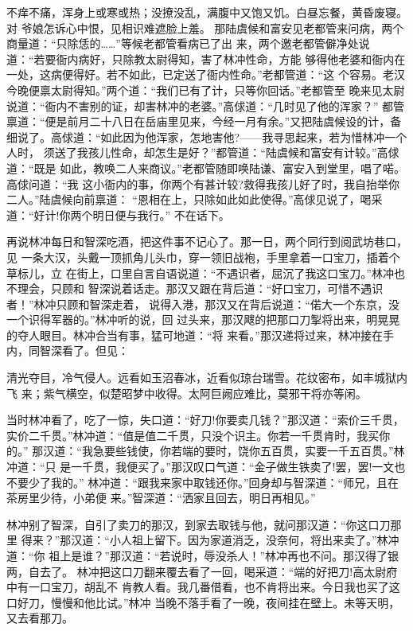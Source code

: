 不痒不痛，浑身上或寒或热；没撩没乱，满腹中又饱又饥。白昼忘餐，黄昏废寝。对
爷娘怎诉心中恨，见相识难遮脸上羞。
那陆虞候和富安见老都管来问病，两个商量道：“只除恁的……”等候老都管看病已了出
来，两个邀老都管僻净处说道：“若要衙内病好，只除教太尉得知，害了林冲性命，方能
够得他老婆和衙内在一处，这病便得好。若不如此，已定送了衙内性命。”老都管道：“这
个容易。老汉今晚便禀太尉得知。”两个道：“我们已有了计，只等你回话。”老都管至
晚来见太尉说道：“衙内不害别的证，却害林冲的老婆。”高俅道：“几时见了他的浑家？”
都管禀道：“便是前月二十八日在岳庙里见来，今经一月有余。”又把陆虞候设的计，备
细说了。高俅道：“如此因为他浑家，怎地害他?——我寻思起来，若为惜林冲一个人时，
须送了我孩儿性命，却怎生是好？”都管道：“陆虞候和富安有计较。”高俅道：“既是
如此，教唤二人来商议。”老都管随即唤陆谦、富安入到堂里，唱了喏。高俅问道：“我
这小衙内的事，你两个有甚计较?救得我孩儿好了时，我自抬举你二人。”陆虞候向前禀道：
“恩相在上，只除如此如此使得。”高俅见说了，喝采道：“好计!你两个明日便与我行。”
不在话下。

再说林冲每日和智深吃酒，把这件事不记心了。那一日，两个同行到阅武坊巷口，见
一条大汉，头戴一顶抓角儿头巾，穿一领旧战袍，手里拿着一口宝刀，插着个草标儿，立
在街上，口里自言自语说道：“不遇识者，屈沉了我这口宝刀。”林冲也不理会，只顾和
智深说着话走。那汉又跟在背后道：“好口宝刀，可惜不遇识者！”林冲只顾和智深走着，
说得入港，那汉又在背后说道：“偌大一个东京，没一个识得军器的。”林冲听的说，回
过头来，那汉飕的把那口刀掣将出来，明晃晃的夺人眼目。林冲合当有事，猛可地道：“将
来看。”那汉递将过来，林冲接在手内，同智深看了。但见：

清光夺目，冷气侵人。远看如玉沼春冰，近看似琼台瑞雪。花纹密布，如丰城狱内飞
来；紫气横空，似楚昭梦中收得。太阿巨阙应难比，莫邪干将亦等闲。

当时林冲看了，吃了一惊，失口道：“好刀!你要卖几钱？”那汉道：“索价三千贯，
实价二千贯。”林冲道：“值是值二千贯，只没个识主。你若一千贯肯时，我买你的。”
那汉道：“我急要些钱使，你若端的要时，饶你五百贯，实要一千五百贯。”林冲道：“只
是一千贯，我便买了。”那汉叹口气道：“金子做生铁卖了!罢，罢!一文也不要少了我的。”
林冲道：“跟我来家中取钱还你。”回身却与智深道：“师兄，且在茶房里少待，小弟便
来。”智深道：“洒家且回去，明日再相见。”

林冲别了智深，自引了卖刀的那汉，到家去取钱与他，就问那汉道：“你这口刀那里
得来？”那汉道：“小人祖上留下。因为家道消乏，没奈何，将出来卖了。”林冲道：“你
祖上是谁？”那汉道：“若说时，辱没杀人！”林冲再也不问。那汉得了银两，自去了。
林冲把这口刀翻来覆去看了一回，喝采道：“端的好把刀!高太尉府中有一口宝刀，胡乱不
肯教人看。我几番借看，也不肯将出来。今日我也买了这口好刀，慢慢和他比试。”林冲
当晚不落手看了一晚，夜间挂在壁上。未等天明，又去看那刀。

